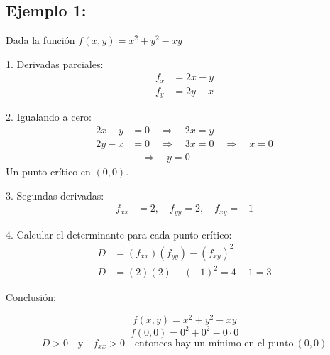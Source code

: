     \subsection{Ejemplo 1:} \cite{matefacil2020}
    

            Dada la función $f(x, y) = x^2 + y^2 - xy$ \vspace{0.2cm}

            1. Derivadas parciales:
                \begin{align*}
                    f_x &= 2x - y \\
                    f_y &= 2y - x
                \end{align*}
            
            2. Igualando a cero:
                \begin{align*}
                    2x - y &= 0 \quad \Rightarrow \quad 2x = y \\
                    2y - x &= 0 \quad \Rightarrow \quad 3x = 0 \quad \Rightarrow \quad x = 0 \\
                    &\quad \Rightarrow \quad y = 0
                \end{align*} 
                Un punto crítico en $(0, 0)$. \vspace{0.2cm}
            
            3. Segundas derivadas:
                \begin{align*}
                    f_{xx} &= 2, \quad f_{yy} = 2, \quad f_{xy} = -1
                \end{align*}
            
           4. Calcular el determinante para cada punto crítico:
                \begin{align*}
                    D &= (f_{xx})(f_{yy}) - (f_{xy})^2 \\
                    D &= (2)(2) - (-1)^2 = 4 - 1 = 3
                \end{align*}

                \vspace{0.2cm}
                Conclusión:
                \vspace{0.2cm}
                
                \[ f(x, y) = x^2 + y^2 - xy \]
                \[ f(0, 0) = 0^2 + 0^2 - 0 \cdot 0 \]
                \[ D > 0 \quad \text{y} \quad f_{xx} > 0 \quad \text{entonces hay un mínimo en el punto} \ (0, 0) \]
                \vspace{0.2cm}
                
